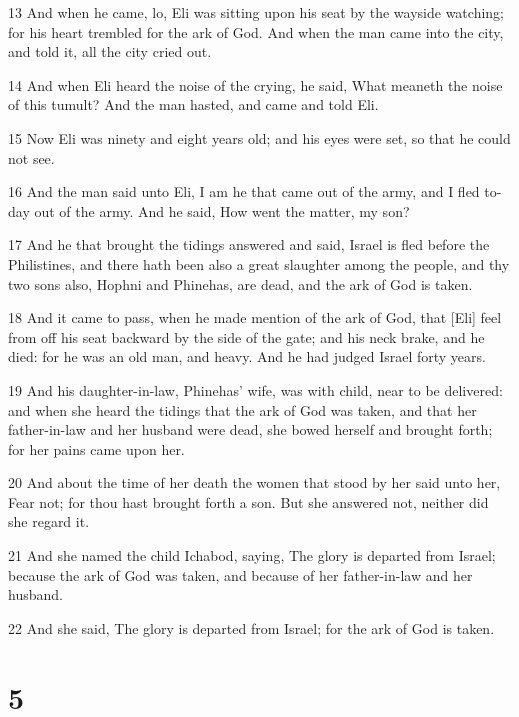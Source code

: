 \par 13 And when he came, lo, Eli was sitting upon his seat by the wayside watching; for his heart trembled for the ark of God. And when the man came into the city, and told it, all the city cried out.
\par 14 And when Eli heard the noise of the crying, he said, What meaneth the noise of this tumult? And the man hasted, and came and told Eli.
\par 15 Now Eli was ninety and eight years old; and his eyes were set, so that he could not see.
\par 16 And the man said unto Eli, I am he that came out of the army, and I fled to-day out of the army. And he said, How went the matter, my son?
\par 17 And he that brought the tidings answered and said, Israel is fled before the Philistines, and there hath been also a great slaughter among the people, and thy two sons also, Hophni and Phinehas, are dead, and the ark of God is taken.
\par 18 And it came to pass, when he made mention of the ark of God, that [Eli] feel from off his seat backward by the side of the gate; and his neck brake, and he died: for he was an old man, and heavy. And he had judged Israel forty years.
\par 19 And his daughter-in-law, Phinehas' wife, was with child, near to be delivered: and when she heard the tidings that the ark of God was taken, and that her father-in-law and her husband were dead, she bowed herself and brought forth; for her pains came upon her.
\par 20 And about the time of her death the women that stood by her said unto her, Fear not; for thou hast brought forth a son. But she answered not, neither did she regard it.
\par 21 And she named the child Ichabod, saying, The glory is departed from Israel; because the ark of God was taken, and because of her father-in-law and her husband.
\par 22 And she said, The glory is departed from Israel; for the ark of God is taken.

\chapter{5}


